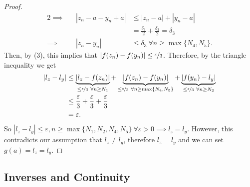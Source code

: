 \documentclass{article}
\newcommand{\?}{\stackrel{?}{=}}
\theoremstyle{definition} %
\begin{document}
\begin{itemize}
\begin{proof}
\begin{alignat*}{2}
                  \implies&& |z_n - a - y_n + a| &\leq |z_n - a| + |y_n - a| \\
                  && &= \frac{\delta_3}{2} + \frac{\delta_3}{2} = \delta_3 \\
                  \implies&& |z_n - y_n| &\leq \delta_3 \ \forall n \geq \max\{N_4, N_5\}.
              \end{alignat*}
              Then, by (3), this implies that $|f(z_n) - f(y_n)| \leq \nicefrac{\varepsilon}{3}$. Therefore, by the triangle inequality we get
              \begin{align*}
                  |l_z - l_y| &\leq \underbrace{|l_z - f(z_n)|}_{\leq \nicefrac{\varepsilon}{3} \ \forall n \geq N_1} + \underbrace{|f(z_n) - f(y_n)|}_{\leq \nicefrac{\varepsilon}{3} \ \forall n \geq \max\{N_4, N_5\}} + \underbrace{|f(y_n) - l_y|}_{\leq \nicefrac{\varepsilon}{3} \ \forall n \geq N_2} \\
                  &\leq \frac{\varepsilon}{3} + \frac{\varepsilon}{3} + \frac{\varepsilon}{3} \\
                  &= \varepsilon.
              \end{align*}
              So $|l_z - l_y| \leq \varepsilon, n \geq \max\{N_1, N_2, N_4, N_5\} \ \forall \varepsilon > 0 \implies l_z = l_y$. However, this contradicts our assumption that $l_z \neq l_y$, therefore $l_z = l_y$ and we can set $g(a) = l_z = l_y$.
          \end{proof}
\end{itemize}

\subsection{Inverses and Continuity}
\end{document}
